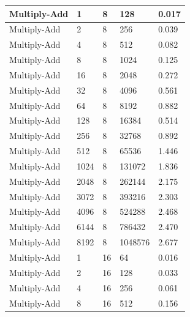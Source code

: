 \documentclass{article}
\begin{document}
\begin{longtable}{|l|l|l|l|l|}
Multiply-Add       & 1    & 8           & 128               & 0.017             \\ \hline
Multiply-Add       & 2    & 8           & 256               & 0.039             \\ \hline
Multiply-Add       & 4    & 8           & 512               & 0.082             \\ \hline
Multiply-Add       & 8    & 8           & 1024              & 0.125             \\ \hline
Multiply-Add       & 16   & 8           & 2048              & 0.272             \\ \hline
Multiply-Add       & 32   & 8           & 4096              & 0.561             \\ \hline
Multiply-Add       & 64   & 8           & 8192              & 0.882             \\ \hline
Multiply-Add       & 128  & 8           & 16384             & 0.514             \\ \hline
Multiply-Add       & 256  & 8           & 32768             & 0.892             \\ \hline
Multiply-Add       & 512  & 8           & 65536             & 1.446             \\ \hline
Multiply-Add       & 1024 & 8           & 131072            & 1.836             \\ \hline
Multiply-Add       & 2048 & 8           & 262144            & 2.175             \\ \hline
Multiply-Add       & 3072 & 8           & 393216            & 2.303             \\ \hline
Multiply-Add       & 4096 & 8           & 524288            & 2.468             \\ \hline
Multiply-Add       & 6144 & 8           & 786432            & 2.470             \\ \hline
Multiply-Add       & 8192 & 8           & 1048576           & 2.677             \\ \hline
Multiply-Add       & 1    & 16          & 64                & 0.016             \\ \hline
Multiply-Add       & 2    & 16          & 128               & 0.033             \\ \hline
Multiply-Add       & 4    & 16          & 256               & 0.061             \\ \hline
Multiply-Add       & 8    & 16          & 512               & 0.156             \\ \hline

\end{longtable}
\end{document}
